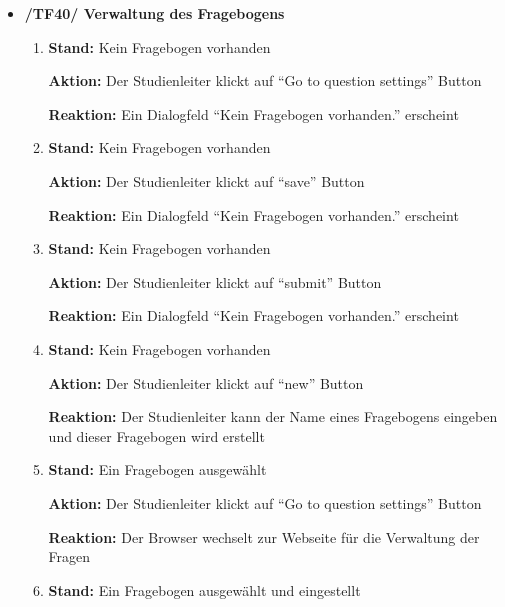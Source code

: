 \documentclass[a4paper]{scrreprt}
\begin{document}
\begin{itemize}
                \item \textbf{/TF40/ Verwaltung des Fragebogens}
                    \begin{enumerate}
                        \item \par \textbf{Stand: }Kein Fragebogen vorhanden
                              \par \textbf{Aktion: }Der \gls{Studienleiter} klickt auf ``Go to question settings'' Button
                              \par \textbf{Reaktion: }Ein Dialogfeld ``Kein Fragebogen vorhanden.'' erscheint
                        \item \par \textbf{Stand: } Kein Fragebogen vorhanden
                              \par \textbf{Aktion: }Der \gls{Studienleiter} klickt auf ``save'' Button
                              \par \textbf{Reaktion: }Ein Dialogfeld ``Kein Fragebogen vorhanden.'' erscheint
                        \item \par \textbf{Stand: }Kein Fragebogen vorhanden
                              \par \textbf{Aktion: }Der \gls{Studienleiter} klickt auf ``submit'' Button
                              \par \textbf{Reaktion: }Ein Dialogfeld ``Kein Fragebogen vorhanden.'' erscheint
                        \item \par \textbf{Stand: }Kein Fragebogen vorhanden
                              \par \textbf{Aktion: }Der \gls{Studienleiter} klickt auf ``new'' Button
                              \par \textbf{Reaktion: }Der \gls{Studienleiter} kann der Name eines Fragebogens eingeben und dieser Fragebogen wird erstellt
                        \item \par \textbf{Stand: }Ein Fragebogen ausgewählt
                              \par \textbf{Aktion: }Der \gls{Studienleiter} klickt auf ``Go to question settings'' Button
                              \par \textbf{Reaktion: }Der Browser wechselt zur Webseite für die Verwaltung der Fragen
                        \item \par \textbf{Stand: }Ein Fragebogen ausgewählt und eingestellt

\end{enumerate}
\end{itemize}
\end{document}
